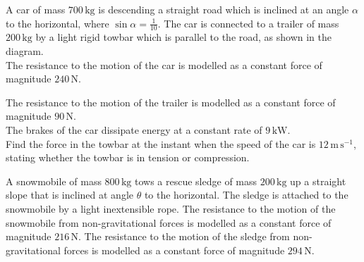 \documentclass[leqno]{article}
\begin{document}
\begin{enumerate}[
  label=\textbf{\arabic*.},
  leftmargin=*,
  topsep=0pt,
  partopsep=0pt,
  parsep=0pt
]
\begin{figure}[H]
\end{figure}


A car of mass $700\,\mathrm{kg}$ is descending a straight road which is inclined at an angle $\alpha$ to the horizontal, where $\sin\alpha=\tfrac{1}{10}$. The car is connected to a trailer of mass $200\,\mathrm{kg}$ by a light rigid towbar which is parallel to the road, as shown in the diagram. \\

The resistance to the motion of the car is modelled as a constant force of magnitude $240\,\mathrm{N}$. 

The resistance to the motion of the trailer is modelled as a constant force of magnitude $90\,\mathrm{N}$. \\

The brakes of the car dissipate energy at a constant rate of $9\,\mathrm{kW}$. \\

Find the force in the towbar at the instant when the speed of the car is $12\,\mathrm{m\,s^{-1}}$, stating whether the towbar is in tension or compression.  \\

\newpage

\questionitem

A snowmobile of mass $800\,\mathrm{kg}$ tows a rescue sledge of mass $200\,\mathrm{kg}$ up a straight slope that is inclined at angle $\theta$ to the horizontal. The sledge is attached to the snowmobile by a light inextensible rope. The resistance to the motion of the snowmobile from non-gravitational forces is modelled as a constant force of magnitude $216\,\mathrm{N}$. The resistance to the motion of the sledge from non-gravitational forces is modelled as a constant force of magnitude $294\,\mathrm{N}$. \\


\end{enumerate}
\end{document}
